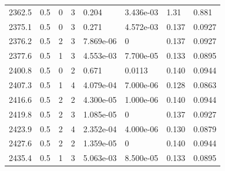 \documentclass[preview]{standalone}
\begin{document}
{{{{{{{{{\begin{tabular}{L{1.2cm}C{1.2cm} C{0.3cm}C{0.5cm} C{1.4cm}C{1.4cm} C{1.4cm}C{1.4cm}}
  2362.5  &   0.5  & 0     &  3 &  0.204  & 3.436e-03  & 1.31 &  0.881   \\ 
  2375.1  &   0.5  & 0     &  3 &  0.271  & 4.572e-03  & 0.137 &  0.0927   \\ 
  2376.2  &   0.5  & 2     &  3 &  7.869e-06  & 0  & 0.137 &  0.0927   \\ 
  2377.6  &   0.5  & 1     &  3 &  4.553e-03  & 7.700e-05  & 0.133 &  0.0895   \\ 
  2400.8  &   0.5  & 0     &  2 &  0.671  & 0.0113  & 0.140 &  0.0944   \\ 
  2407.3  &   0.5  & 1     &  4 &  4.079e-04  & 7.000e-06  & 0.128 &  0.0863   \\ 
  2416.6  &   0.5  & 2     &  2 &  4.300e-05  & 1.000e-06  & 0.140 &  0.0944   \\ 
  2419.8  &   0.5  & 2     &  3 &  1.085e-05  & 0  & 0.137 &  0.0927   \\ 
  2423.9  &   0.5  & 2     &  4 &  2.352e-04  & 4.000e-06  & 0.130 &  0.0879   \\ 
  2427.6  &   0.5  & 2     &  2 &  1.359e-05  & 0  & 0.140 &  0.0944   \\ 
  2435.4  &   0.5  & 1     &  3 &  5.063e-03  & 8.500e-05  & 0.133 &  0.0895   \\ 
\hline 
\end{tabular} 

}}}}}}}}}
\end{document}
